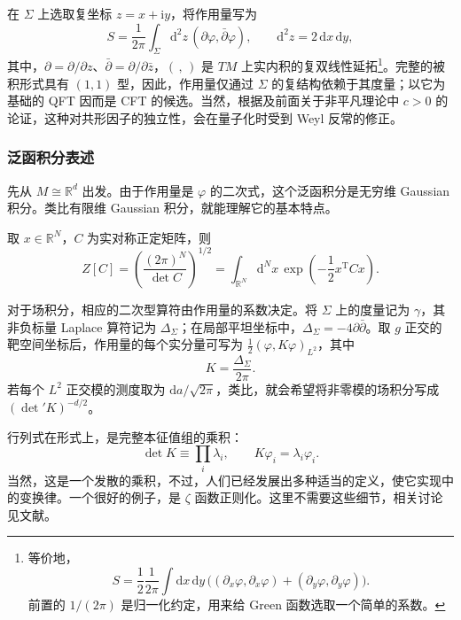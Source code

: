 在 $\Sigma$ 上选取复坐标 $z=x+\mathrm{i}y$，将作用量写为
\[
S=\frac1{2\pi}\int_\Sigma\mathrm{d}^2z\,
(\partial\varphi,\bar\partial\varphi),
\qquad\mathrm{d}^2z=2\,\mathrm{d}x\,\mathrm{d}y,
\]
其中，$\partial=\partial/\partial z$、$\bar\partial=\partial/\partial\bar z$，$(\, ,\,)$ 是 $TM$ 上实内积的复双线性延拓\footnote{等价地，
\[
S=\frac12\frac1{2\pi}\int\mathrm{d}x\,\mathrm{d}y\,
\bigl((\partial_x\varphi,\partial_x\varphi)
+(\partial_y\varphi,\partial_y\varphi)\bigr).
\]
前置的 $1/(2\pi)$ 是归一化约定，用来给 Green 函数选取一个简单的系数。}。完整的被积形式具有 $(1,1)$ 型，因此，作用量仅通过 $\Sigma$ 的复结构依赖于其度量；以它为基础的 QFT 因而是 CFT 的候选。当然，根据及前面关于非平凡理论中 $c>0$ 的论证，这种对共形因子的独立性，会在量子化时受到 Weyl 反常的修正。

\subsubsection{泛函积分表述}\label{sec:3.2.3.1}

先从 $M\cong\mathbb{R}^d$ 出发。由于作用量是 $\varphi$ 的二次式，这个泛函积分是无穷维 Gaussian 积分。类比有限维 Gaussian 积分，就能理解它的基本特点。
\begin{example*}
取 $x\in\mathbb{R}^N$，$C$ 为实对称正定矩阵，则
\begin{equation}\label{eq:3.37}
Z[C]=\left(\frac{(2\pi)^N}{\det C}\right)^{1/2}
=\int_{\mathbb{R}^N}\mathrm{d}^Nx\,
\exp\left(-\frac12x^{\mathrm T}Cx\right).
\end{equation}
\end{example*}
对于场积分，相应的二次型算符由作用量的系数决定。将 $\Sigma$ 上的度量记为 $\gamma$，其非负标量 Laplace 算符记为 $\Delta_\Sigma$；在局部平坦坐标中，$\Delta_\Sigma=-4\partial\bar\partial$。取 $g$ 正交的靶空间坐标后，作用量的每个实分量可写为 $\tfrac12(\varphi,K\varphi)_{L^2}$，其中
\[
K=\frac{\Delta_\Sigma}{2\pi}.
\]
若每个 $L^2$ 正交模的测度取为 $\mathrm{d}a/\sqrt{2\pi}$，类比，就会希望将非零模的场积分写成 $(\det{}'K)^{-d/2}$。

行列式在形式上，是完整本征值组的乘积：
\[
\det K\equiv\prod_i\lambda_i,\qquad
K\varphi_i=\lambda_i\varphi_i.
\]
当然，这是一个发散的乘积，不过，人们已经发展出多种适当的定义，使它实现中的变换律。一个很好的例子，是 $\zeta$ 函数正则化。这里不需要这些细节，相关讨论见文献。

